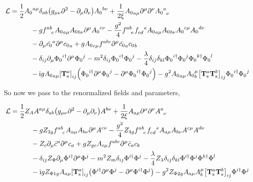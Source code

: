 \begin{align}
    \mathcal L&=\frac12{A_0}^{a\mu}\delta_{ab}\qty(g_{\mu\nu}\partial^2 -\partial_\mu\partial_\nu ){A_0}^{b\nu}+\frac{1}{2\xi} {A_0}_{a\mu}\partial^\mu\partial^\nu \tensor{{A_0}}{^a_\nu}\nonumber\\
    &\quad\quad\quad-g\tensor{f}{^a^b_c}{A_0}_{a\mu}{A_0}_{b\nu}\partial^\mu {A_0}^{c\nu}-\frac{g^2}{4}\tensor{f}{^a^b_e}\tensor{f}{_c_d^e}{A_0}_{a\mu}{A_0}_{b\nu}{A_0}^{c\mu}{A_0}^{d\nu}\nonumber\\
    &\quad\quad\quad -\partial_\mu\bar {c_0}^a\partial^\mu {c_0}_a+g {A_0}_{c\mu}\tensor{f}{^a^b^c}\partial^\mu \bar {c_0}_a{c_0}_b\nonumber\\
    &\quad\quad\quad-\delta_{ij}\partial_\mu{\Phi_0}^{i\dagger}\partial^\mu{\Phi_0}^j-m^2\delta_{ij}{\Phi_0}^{i\dagger}{\Phi_0}^j
    -\frac\lambda4\delta_{ij}\delta_{kl}{\Phi_0}^{i\dagger}{\Phi_0}^{j}{\Phi_0}^{k\dagger}{\Phi_0}^{l}\nonumber\\
    &\quad\quad\quad
    -\im g{A_0}_{a\mu}\tensor{\qty[\vb T^{a}_{\textnormal s}]}{_i_j}\qty({\Phi_0}^{i\dagger}\partial^\mu{\Phi_0}^j-\partial^\mu{\Phi_0}^{i\dagger}{\Phi_0}^j)
    -g^2{A_0}_{a\mu}{A_0}_b^\mu
    \tensor{\qty[\vb T^{a}_{\textnormal s}\vb T^b_{\textnormal s}]}{_i_j}
    {\Phi_0}^{i\dagger}{\Phi_0}^j\nonumber
\end{align}

So now we pass to the renormalized fields and parameters,

\begin{align}
    \mathcal L&=\frac12Z_AA^{a\mu}\delta_{ab}\qty(g_{\mu\nu}\partial^2 -\partial_\mu\partial_\nu )A^{b\nu}+\frac{1}{2\xi} A_{a\mu}\partial^\mu\partial^\nu \tensor{A}{^a_\nu}\nonumber\\
    &\quad\quad\quad-gZ_{3g}\tensor{f}{^a^b_c}A_{a\mu}A_{b\nu}\partial^\mu A^{c\nu}-\frac{g^2}{4}Z_{4g}\tensor{f}{^a^b_e}\tensor{f}{_c_d^e}A_{a\mu}A_{b\nu}A^{c\mu}A^{d\nu}\nonumber\\
    &\quad\quad\quad -Z_{c}\partial_\mu\bar c^a\partial^\mu c_a+g Z_{gc}A_{c\mu}\tensor{f}{^a^b^c}\partial^\mu \bar c_ac_b\nonumber\\
    &\quad\quad\quad-\delta_{ij}Z_\Phi\partial_\mu\Phi^{i\dagger}\partial^\mu\Phi^j-m^2Z_m\delta_{ij}\Phi^{i\dagger}\Phi^j
    -\frac\lambda4Z_\lambda\delta_{ij}\delta_{kl}\Phi^{i\dagger}\Phi^{j}\Phi^{k\dagger}\Phi^{l}\nonumber\\
    &\quad\quad\quad
    -\im gZ_{\Phi 1g}A_{a\mu}\tensor{\qty[\vb T^{a}_{\textnormal s}]}{_i_j}\qty(\Phi^{i\dagger}\partial^\mu\Phi^j-\partial^\mu\Phi^{i\dagger}\Phi^j)
    -g^2Z_{\Phi 2g}A_{a\mu}A_b^\mu
    \tensor{\qty[\vb T^{a}_{\textnormal s}\vb T^b_{\textnormal s}]}{_i_j}
    \Phi^{i\dagger}\Phi^j\nonumber
\end{align}

